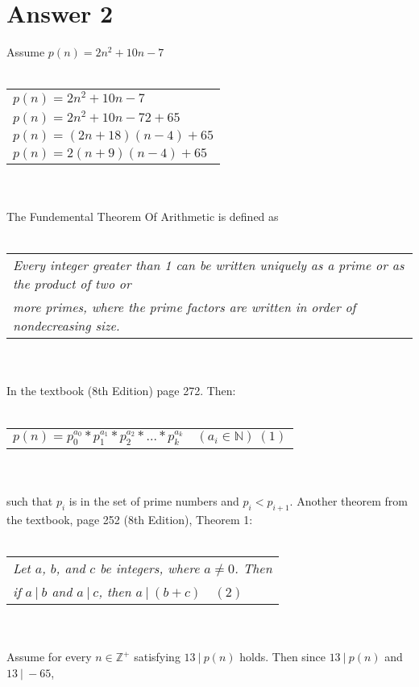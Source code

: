\documentclass[12pt]{article}
\begin{document}
\section*{Answer 2}
Assume $p(n)=2n^2+10n-7$
\\ \\
\begin{tabular}{l}
    $p(n)=2n^2+10n-7$\\
    $p(n)=2n^2+10n-72+65$\\
    $p(n)=(2n+18)(n-4)+65$\\
    $p(n)=2(n+9)(n-4)+65$\\
\end{tabular}
\\ \\
The Fundemental Theorem Of Arithmetic is defined as
\\ \\
\begin{tabular}{l}
    \textit{Every integer greater than 1
    can be written uniquely as a prime or as the product of two or }\\
    \textit{more primes, where the prime
    factors are written in order of nondecreasing size.}\\
\end{tabular}
\\ \\
In the textbook (8th Edition) page 272. Then:
\\ \\
\begin{tabular}{l}
    $p(n)=p_0^{a_0}*p_1^{a_1}*p_2^{a_2}*...*p_k^{a_k} \quad (a_i \in \mathbb{N})\ (1)$\\
\end{tabular}
\\ \\
such that $p_i$ is in the set of prime numbers and $p_i < p_{i+1}$.
Another theorem from the textbook, page 252 (8th Edition), Theorem 1:
\\ \\
\begin{tabular}{l}
    \textit{Let $a$, $b$, and $c$ be integers, where $a \neq 0$. Then}\\
    \textit{if $a\ |\ b$ and $a\ |\ c$, then $a\ |\ (b + c)$}$\quad (2)$\\
\end{tabular}
\\ \\
Assume for every $n \in \mathbb{Z^+}$ satisfying $13\ |\ p(n)$ holds. Then since $13\ |\ p(n)$ and $13\ |\ -65$,
\end{document}
